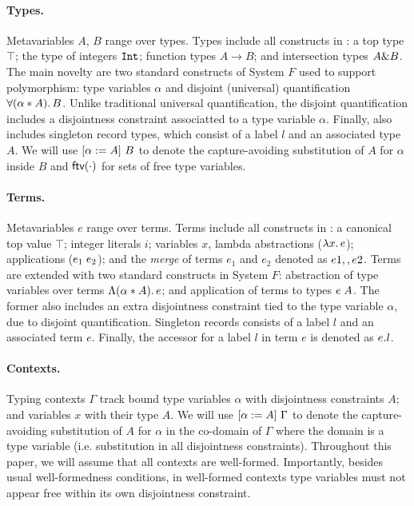 
\paragraph{Types.} 
Metavariables $A$, $B$ range over types. 
Types include all constructs in \oldname: a top type $\top$; 
the type of integers $\tyint$;
function types $A \to B$; and intersection types $A \inter B$.
The main novelty are two standard constructs of System $F$ used to support
polymorphism: 
type variables $\alpha$ and disjoint (universal) quantification $\fordis \alpha A B$. 
Unlike traditional universal quantification, the disjoint
quantification includes a disjointness constraint associatted to a type variable $\alpha$.
Finally, \name also includes singleton record types, which consist of a label $l$ and
an associated type $A$.
We will use $\subst {A} \alpha {B}$
to denote the capture-avoiding substitution of $A$ for $\alpha$ inside $B$ and
$\ftv \cdot$ for sets of free type variables. 

\paragraph{Terms.} 
Metavariables $e$ range over terms.  
Terms include all constructs in \oldname: a canonical top value $\top$; integer literals $i$;
variables $x$, lambda abstractions ($\lamty x A e$); applications 
($\app {e_1} {e_2}$); and the \emph{merge} of terms $e_1$ and $e_2 $ denoted as 
$e1 \mergeop e2$.
Terms are extended with two standard constructs in System $F$:
abstraction of type variables over terms $\blamdis \alpha A e$; and
application of terms to types $\tapp e A$. 
The former also includes an extra disjointness constraint tied to the type 
variable $\alpha$, due to disjoint quantification.
Singleton records consists of a label $l$ and an associated term $e$.
Finally, the accessor for a label $l$ in term $e$ is denoted as $\recordProj e l$.

\paragraph{Contexts.} Typing contexts $ \Gamma $ track bound type variables
$\alpha$ with disjointness constraints $A$; and variables $x$ with their type $A$. 
We will use $\subst {A} \alpha {\Gamma}$
to denote the capture-avoiding substitution of $A$ for $\alpha$ in the co-domain of
$\Gamma$ where the domain is a type variable (i.e. substitution in all disjointness constraints).
Throughout this paper, we will assume that all contexts are
well-formed. Importantly, besides usual well-formedness conditions, in
well-formed contexts type variables must not appear free within its own disjointness constraint.

